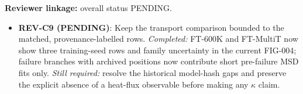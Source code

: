 \textbf{Reviewer linkage:} overall status PENDING.
\begin{itemize}[leftmargin=1.4em,noitemsep]
\item \textbf{REV-C9 (PENDING)}: Keep the transport comparison bounded to the matched, provenance-labelled rows. \emph{Completed:} FT-600K and FT-MultiT now show three training-seed rows and family uncertainty in the current FIG-004; failure branches with archived positions now contribute short pre-failure MSD fits only. \emph{Still required:} resolve the historical model-hash gaps and preserve the explicit absence of a heat-flux observable before making any $\kappa$ claim.
\end{itemize}
